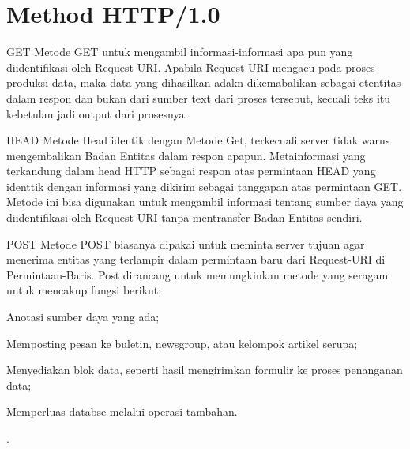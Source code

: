 \section{Method HTTP/1.0}
\begin{itemsize}
\item GET
Metode GET untuk mengambil informasi-informasi apa pun yang diidentifikasi oleh Request-URI. Apabila Request-URI mengacu pada proses produksi data, maka data yang dihasilkan adakn dikemabalikan sebagai etentitas dalam respon dan bukan dari sumber text dari proses tersebut, kecuali teks itu kebetulan jadi output dari prosesnya.

\item HEAD
Metode Head identik dengan Metode Get, terkecuali server tidak warus mengembalikan Badan Entitas dalam respon apapun. Metainformasi yang terkandung dalam head HTTP sebagai respon atas permintaan HEAD yang identtik dengan informasi yang dikirim sebagai tanggapan atas permintaan GET. Metode ini bisa digunakan untuk mengambil informasi tentang sumber daya yang diidentifikasi oleh Request-URI tanpa mentransfer Badan Entitas sendiri.

\item POST
Metode POST biasanya dipakai untuk meminta server tujuan  agar menerima entitas yang terlampir dalam permintaan baru dari Request-URI di Permintaan-Baris. Post dirancang untuk memungkinkan metode yang seragam untuk mencakup fungsi berikut;
\begin{itemsize}
	\item Anotasi sumber daya yang ada;
	\item Memposting pesan ke buletin, newsgroup, atau kelompok artikel serupa;
	\item Menyediakan blok data, seperti hasil mengirimkan formulir ke proses penanganan data;
	\item Memperluas databse melalui operasi tambahan.
	\end{itemsize}
\end{itemsize}\cite{berner1996hypertext}.
